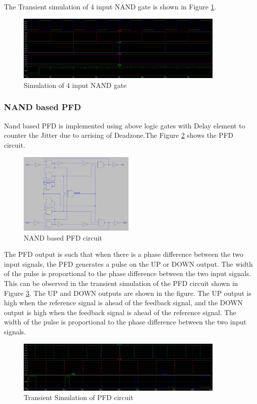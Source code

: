 The Transient simulation of 4 input NAND gate is shown in Figure \ref{fig:4nand_output}.
\begin{figure}[H]
	\centering
	\includegraphics[width=0.9\textwidth]{figs/nand4op.png}
	\caption{Simulation of 4 input NAND gate}
	\label{fig:4nand_output}
	\vspace{0.5cm}
\end{figure}
\subsubsection{NAND based PFD}
Nand based PFD is implemented using above logic gates with Delay element to counter the Jitter due to arrising of Deadzone.The Figure \ref{nand_pfd} shows the PFD circuit.
\begin{figure}[H]
	\centering
	\includegraphics[width=0.5\textwidth]{figs/pfd_circuit}
	\caption{NAND based PFD circuit}
	\label{nand_pfd}
	\vspace{0.5cm}
\end{figure}
The PFD output is such that when there is a phase difference between the two input signals, the PFD generates a pulse on the UP or DOWN output. The width of the pulse is proportional to the phase difference between the two input signals. This can be observed in the transient simulation of the PFD circuit shown in Figure \ref{fig:pfd_op}. The UP and DOWN outputs are shown in the figure. The UP output is high when the reference signal is ahead of the feedback signal, and the DOWN output is high when the feedback signal is ahead of the reference signal. The width of the pulse is proportional to the phase difference between the two input signals.
\begin{figure}[H]
	\centering
	\includegraphics[width=0.9\textwidth]{figs/pfdop.png}
	\caption{Transient Simulation of PFD circuit}
	\label{fig:pfd_op}
	\vspace{0.5cm}
\end{figure}
